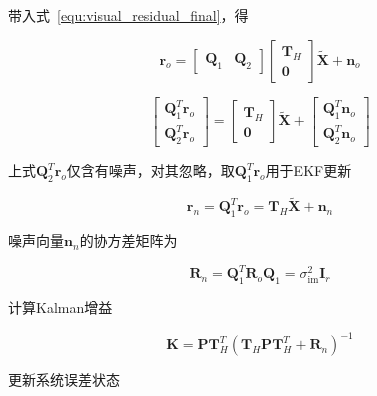\documentclass[12pt,a4paper]{article}
\begin{document}
带入式~\eqref{equ:visual_residual_final}，得

\begin{equation}
\mathbf{r}_{o}=\left[\begin{array}{ll}{\mathbf{Q}_{1}} & {\mathbf{Q}_{2}}\end{array}\right]\left[\begin{array}{c}{\mathbf{T}_{H}} \\ {\mathbf{0}}\end{array}\right] \tilde{\mathbf{X}}+\mathbf{n}_{o}
\end{equation}

\begin{equation}
\left[\begin{array}{l}
{\mathbf{Q}_{1}^{T} \mathbf{r}_{o}} \\ {\mathbf{Q}_{2}^{T} \mathbf{r}_{o}}\end{array}\right]=\left[\begin{array}{c}{\mathbf{T}_{H}} \\ {\mathbf{0}}\end{array}\right] \tilde{\mathbf{X}}+\left[\begin{array}{l}{\mathbf{Q}_{1}^{T} \mathbf{n}_{o}} \\ {\mathbf{Q}_{2}^{T} \mathbf{n}_{o}}\end{array}\right]
\end{equation}

上式${\mathbf{Q}_{2}^{T} \mathbf{r}_{o}}$仅含有噪声，对其忽略，取$\mathbf{Q}_{1}^{T} \mathbf{r}_{o}$用于EKF更新

\begin{equation}
\mathbf{r}_{n}=\mathbf{Q}_{1}^{T} \mathbf{r}_{o}=\mathbf{T}_{H} \widetilde{\mathbf{X}}+\mathbf{n}_{n}
\end{equation}

噪声向量$\mathbf{n}_{n}$的协方差矩阵为

\begin{equation}
\mathbf{R}_{n}=
\mathbf{Q}_{1}^{T} \mathbf{R}_{o} \mathbf{Q}_{1}=\sigma_{\mathrm{im}}^{2} \mathbf{I}_{r}
\end{equation}

计算Kalman增益

\begin{equation}
\mathbf{K}=\mathbf{P} \mathbf{T}_{H}^{T}\left(\mathbf{T}_{H} \mathbf{P} \mathbf{T}_{H}^{T}+\mathbf{R}_{n}\right)^{-1}
\end{equation}

更新系统误差状态
\end{document}
